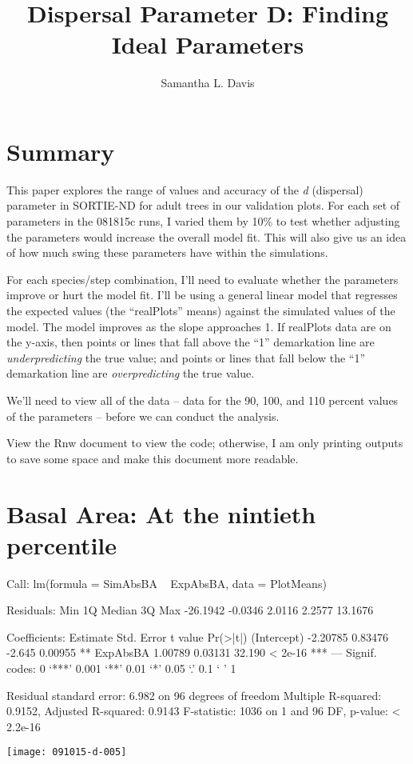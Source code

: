 \documentclass{article}
\begin{document}


\title{Dispersal Parameter D: Finding Ideal Parameters}
\author{Samantha L. Davis}

\maketitle

\section{Summary}
This paper explores the range of values and accuracy of the \textit{d} (dispersal) parameter in SORTIE-ND for adult trees in our validation plots. For each set of parameters in the 081815c runs, I varied them by 10\% to test whether adjusting the parameters would increase the overall model fit. This will also give us an idea of how much swing these parameters have within the simulations. 

For each species/step combination, I'll need to evaluate whether the parameters improve or hurt the model fit. I'll be using a general linear model that regresses the expected values (the ``realPlots'' means) against the simulated values of the model. The model improves as the slope approaches 1. If realPlots data are on the y-axis, then points or lines that fall above the ``1'' demarkation line are \textit{underpredicting} the true value; and points or lines that fall below the ``1'' demarkation line are \textit{overpredicting} the true value.

We'll need to view all of the data -- data for the 90, 100, and 110 percent values of the parameters -- before we can conduct the analysis. 

View the Rnw document to view the code; otherwise, I am only printing outputs to save some space and make this document more readable.







\newpage

\section{Basal Area: At the nintieth percentile}
\begin{Schunk}
\begin{Soutput}
Call:
lm(formula = SimAbsBA ~ ExpAbsBA, data = PlotMeans)

Residuals:
     Min       1Q   Median       3Q      Max 
-26.1942  -0.0346   2.0116   2.2577  13.1676 

Coefficients:
            Estimate Std. Error t value Pr(>|t|)    
(Intercept) -2.20785    0.83476  -2.645  0.00955 ** 
ExpAbsBA     1.00789    0.03131  32.190  < 2e-16 ***
---
Signif. codes:  0 ‘***’ 0.001 ‘**’ 0.01 ‘*’ 0.05 ‘.’ 0.1 ‘ ’ 1

Residual standard error: 6.982 on 96 degrees of freedom
Multiple R-squared:  0.9152,	Adjusted R-squared:  0.9143 
F-statistic:  1036 on 1 and 96 DF,  p-value: < 2.2e-16
\end{Soutput}
\end{Schunk}
\texttt{[image: 091015-d-005]}
\end{document}
